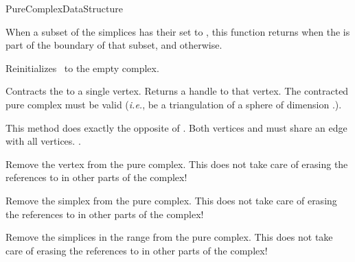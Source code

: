 \begin{ccRefConcept}{PureComplexDataStructure}
\begin{ccAdvanced}
{When a subset of the simplices has their  set to , this
function returns  when the  is part of the boundary of
that subset, and  otherwise.}

\end{ccAdvanced}


{Reinitializes \ccVar\ to the empty complex.}

 {Contracts the
 to a single vertex. Returns a handle to that vertex. \ccPrecond
The contracted pure complex must be valid (\emph{i.e.}, be a triangulation of
a sphere of dimension \ccVar.).}

 {This method does exactly the opposite of
. \ccPrecond Both vertices  and
 must share an edge with all vertices.
.}

\begin{ccAdvanced}

{Remove the vertex  from the pure complex. This does not take care of
erasing the references to  in other parts of the complex!}

{Remove the simplex  from the pure complex. This does not take care of
erasing the references to  in other parts of the complex!}

{Remove the simplices in the range \ccc{[start,end)} from the pure complex.
This does not take care of erasing the references to  in other parts of
the complex!}

\end{ccAdvanced}



\end{ccRefConcept}
